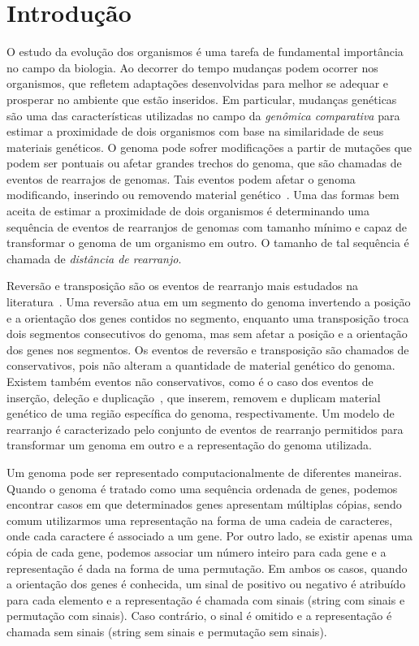 \chapter{Introdução}

O estudo da evolução dos organismos é uma tarefa de fundamental importância no campo da biologia. Ao decorrer do tempo mudanças podem ocorrer nos organismos, que refletem adaptações desenvolvidas para melhor se adequar e prosperar no ambiente que estão inseridos. Em particular, mudanças genéticas são uma das características utilizadas no campo da \emph{genômica comparativa} para estimar a proximidade de dois organismos com base na similaridade de seus materiais genéticos. O genoma pode sofrer modificações a partir de mutações que podem ser pontuais ou afetar grandes trechos do genoma, que são chamadas de eventos de rearrajos de genomas. Tais eventos podem afetar o genoma modificando, inserindo ou removendo material genético~\cite{2009-fertin-etal}. Uma das formas bem aceita de estimar a proximidade de dois organismos é determinando uma sequência de eventos de rearranjos de genomas com tamanho mínimo e capaz de transformar o genoma de um organismo em outro. O tamanho de tal sequência é chamada de \emph{distância de rearranjo}.

Reversão e transposição são os eventos de rearranjo mais estudados na literatura~\cite{2005-bergeron,1998-bafna-pevzner}. Uma reversão atua em um segmento do genoma invertendo a posição e a orientação dos genes contidos no segmento, enquanto uma transposição troca dois segmentos consecutivos do genoma, mas sem afetar a posição e a orientação dos genes nos segmentos. Os eventos de reversão e transposição são chamados de conservativos, pois não alteram a quantidade de material genético do genoma. Existem também eventos não conservativos, como é o caso dos eventos de inserção, deleção e duplicação~\cite{2013-willing-etal,2012-elmabrouk-sankoff,2008-kahn-raphael,2020-lafond-etal,2010-lin-etal,2009-bader}, que inserem, removem e duplicam material genético de uma região específica do genoma, respectivamente. Um modelo de rearranjo é caracterizado pelo conjunto de eventos de rearranjo permitidos para transformar um genoma em outro e a representação do genoma utilizada.

Um genoma pode ser representado computacionalmente de diferentes maneiras. Quando o genoma é tratado como uma sequência ordenada de genes, podemos encontrar casos em que determinados genes apresentam múltiplas cópias, sendo comum utilizarmos uma representação na forma de uma cadeia de caracteres, onde cada caractere é associado a um gene. Por outro lado, se existir apenas uma cópia de cada gene, podemos associar um número inteiro para cada gene e a representação é dada na forma de uma permutação. Em ambos os casos, quando a orientação dos genes é conhecida, um sinal de positivo ou negativo é atribuído para cada elemento e a representação é chamada com sinais (string com sinais e permutação com sinais). Caso contrário, o sinal é omitido e a representação é chamada sem sinais (string sem sinais e permutação sem sinais).

